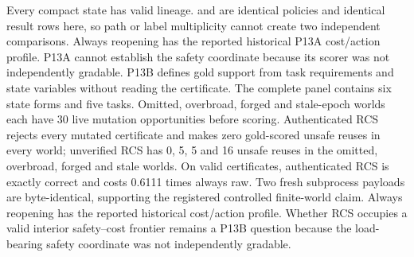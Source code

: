 {}
\markdownRendererSectionEnd \markdownRendererSectionBegin
{}\markdownRendererInterblockSeparator
{}Every compact state has valid lineage.  and  are identical policies and identical result rows here, so path or label multiplicity cannot create two independent comparisons.\markdownRendererInterblockSeparator
{}
\markdownRendererSectionEnd \markdownRendererSectionBegin
{}\markdownRendererInterblockSeparator
{}Always reopening has the reported historical P13A cost/action profile. P13A cannot establish the safety coordinate because its scorer was not independently gradable.\markdownRendererInterblockSeparator
{}
\markdownRendererSectionEnd \markdownRendererSectionBegin
{}\markdownRendererInterblockSeparator
{}P13B defines gold support from task requirements and state variables without reading the certificate. The complete panel contains six state forms and five tasks. Omitted, overbroad, forged and stale-epoch worlds each have 30 live mutation opportunities before scoring. Authenticated RCS rejects every mutated certificate and makes zero gold-scored unsafe reuses in every world; unverified RCS has 0, 5, 5 and 16 unsafe reuses in the omitted, overbroad, forged and stale worlds. On valid certificates, authenticated RCS is exactly correct and costs 0.6111 times always raw. Two fresh subprocess payloads are byte-identical, supporting the registered controlled finite-world claim. Always reopening has the reported historical cost/action profile. Whether RCS occupies a valid interior safety–cost frontier remains a P13B question because the load-bearing safety coordinate was not independently gradable.
\markdownRendererSectionEnd 
\markdownRendererSectionEnd \markdownRendererDocumentEnd